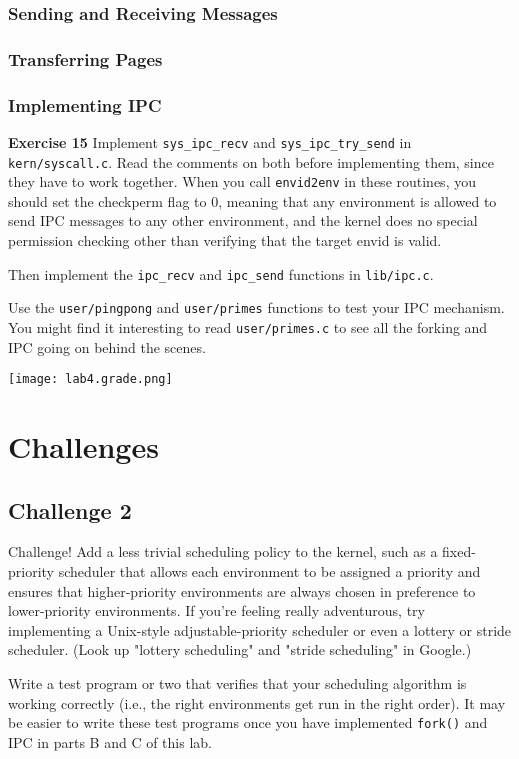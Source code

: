 \documentclass[11pt]{article}
\begin{document}
\subsubsection{Sending and Receiving Messages}
\subsubsection{Transferring Pages}
\subsubsection{Implementing IPC}
\begin{framed}
\noindent\textbf{Exercise 15} Implement \lstinline|sys_ipc_recv| and \lstinline|sys_ipc_try_send| in \lstinline|kern/syscall.c|. Read the comments on both before implementing them, since they have to work together. When you call \lstinline|envid2env| in these routines, you should set the checkperm flag to 0, meaning that any environment is allowed to send IPC messages to any other environment, and the kernel does no special permission checking other than verifying that the target envid is valid.

Then implement the \lstinline|ipc_recv| and \lstinline|ipc_send| functions in \lstinline|lib/ipc.c|.

Use the \lstinline|user/pingpong| and \lstinline|user/primes| functions to test your IPC mechanism. You might find it interesting to read \lstinline|user/primes.c| to see all the forking and IPC going on behind the scenes.
\end{framed}

\begin{center}
\texttt{[image: lab4.grade.png]}
\end{center}

\section{Challenges}

\subsection{Challenge 2}
\begin{framed}
Challenge! Add a less trivial scheduling policy to the kernel, such as a fixed-priority scheduler that allows each environment to be assigned a priority and ensures that higher-priority environments are always chosen in preference to lower-priority environments. If you're feeling really adventurous, try implementing a Unix-style adjustable-priority scheduler or even a lottery or stride scheduler. (Look up "lottery scheduling" and "stride scheduling" in Google.)

Write a test program or two that verifies that your scheduling algorithm is working correctly (i.e., the right environments get run in the right order). It may be easier to write these test programs once you have implemented \lstinline|fork()| and IPC in parts B and C of this lab.
\end{framed}
\end{document}
